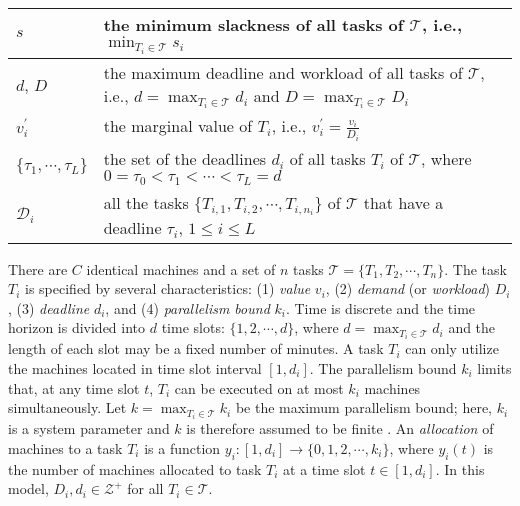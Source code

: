 \documentclass[10pt,journal,compsoc]{IEEEtran}
\begin{document}
\begin{table}
\begin{threeparttable}[!ht]
\begin{tabular}{|C{1.5cm}|C{6.2cm}|}
$s$  &  the minimum slackness of all tasks of $\mathcal{T}$, i.e., $\min_{T_{i}\in\mathcal{T}}{s_{i}}$ \\ \hline

$d$, $D$ & the maximum deadline and workload of all tasks of $\mathcal{T}$, i.e., $d=\max_{T_{i}\in\mathcal{T}}{d_{i}}$ and $D=\max_{T_{i}\in\mathcal{T}}{D_{i}}$ \\ \hline

$v_{i}^{\prime}$ & the marginal value of $T_{i}$, i.e., $v_{i}^{\prime}=\frac{v_{i}}{D_{i}}$ \\ \hline

$\{\tau_{1}, \cdots, \tau_{L}\}$ & the set of the deadlines $d_{i}$ of all tasks $T_{i}$ of $\mathcal{T}$, where $0=\tau_{0} < \tau_{1}< \cdots < \tau_{L}=d$ \\ \hline

$\mathcal{D}_{i}$ & all the tasks $\{T_{i,1}, T_{i,2}, \cdots, T_{i,n_{i}} \}$ of $\mathcal{T}$ that have a deadline $\tau_{i}$, $1\leq i\leq L$ \\ \hline

\end{tabular}
\label{table-1}
 \end{threeparttable}
\end{table}







There are $C$ identical machines and a set of $n$ tasks $\mathcal{T} = \{T_{1}, T_{2}, \cdots, T_{n}\}$. The task $T_{i}$ is specified by several characteristics: (1) {\em value} $v_{i}$, (2) {\em demand} (or {\em workload}) $D_{i}$, (3) {\em deadline} $d_{i}$, and (4) {\em parallelism bound} $k_{i}$. Time is discrete and the time horizon is divided into $d$ time slots: $\{1, 2, \cdots, d\}$, where $d=\max_{T_{i}\in\mathcal{T}}{d_{i}}$ and the length of each slot may be a fixed number of minutes. A task $T_{i}$ can only utilize the machines located in time slot interval $[1, d_{i}]$. The parallelism bound $k_{i}$ limits that, at any time slot $t$, $T_{i}$ can be executed on at most $k_{i}$ machines simultaneously. Let $k=\max_{T_{i}\in\mathcal{T}}{k_{i}}$ be the maximum parallelism bound; here, $k_{i}$ is a system parameter and $k$ is therefore assumed to be finite \cite{White}. An {\em allocation} of machines to a task $T_{i}$ is a function $y_{i}: [1, d_{i}]\rightarrow \{0, 1, 2, \cdots, k_{i}\}$, where $y_{i}(t)$ is the number of machines allocated to task $T_i$ at a time slot $t\in [1, d_{i}]$. In this model, $D_{i}, d_{i}\in\mathcal{Z}^{+}$ for all $T_{i}\in\mathcal{T}$.
\end{document}
